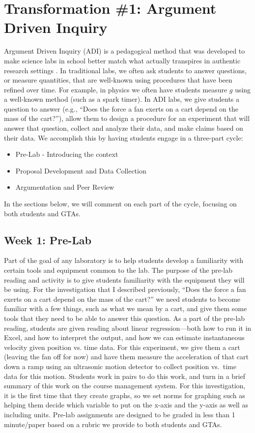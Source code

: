 \documentclass[aip, numerical, preprint]{revtex4-2}
\begin{document}
\section{Transformation \#1: Argument Driven Inquiry}
Argument Driven Inquiry (ADI) is a pedagogical method that was developed to make science labs
in school better match what actually transpires in authentic research settings
\cite{Walker2011,Sampson2011,Walker2016}.  In traditional labs, we often ask students to answer
questions, or measure quantities, that are well-known using procedures that have been refined
over time.  For example, in physics we often have students measure $g$ using a well-known
method (such as a spark timer).  In ADI labs, we give students a question to answer (e.g.,
``Does the force a fan exerts on a cart depend on the mass of the cart?''), allow them to
design a procedure for an experiment that will answer that question, collect and analyze their
data, and make claims based on their data.  We accomplish this by having students engage in a
three-part cycle:
\begin{itemize}
  \item Pre-Lab - Introducing the context
  \item Proposal Development and Data Collection
  \item Argumentation and Peer Review
\end{itemize}
In the sections below, we will comment on each part of the cycle, focusing on both students and
GTAs.

\subsection{Week 1: Pre-Lab}
Part of the goal of any laboratory is to help students develop a familiarity with certain tools
and equipment common to the lab.  The purpose of the pre-lab reading and activity is to give
students familiarity with the equipment they will be using.  For the investigation that I
described previously, ``Does the force a fan exerts on a cart depend on the mass of the cart?''
we need students to become familiar with a few things, such as what we mean by a cart, and give
them some tools that they need to be able to answer this question.  As a part of the pre-lab
reading, students are given reading about linear regression---both how to run it in Excel, and
how to interpret the output, and how we can estimate instantaneous velocity given position
vs. time data. For this experiment, we give them a cart (leaving the fan off for now) and have
them measure the acceleration of that cart down a ramp using an ultrasonic motion detector to
collect position vs.\ time data for this motion.  Students work in pairs to do this work, and
turn in a brief summary of this work on the course management system.  For this investigation,
it is the first time that they create graphs, so we set norms for graphing such as helping them
decide which variable to put on the x-axis and the y-axis as well as including units.  Pre-lab
assignments are designed to be graded in less than 1 minute/paper based on a rubric we provide
to both students and GTAs.
\end{document}
